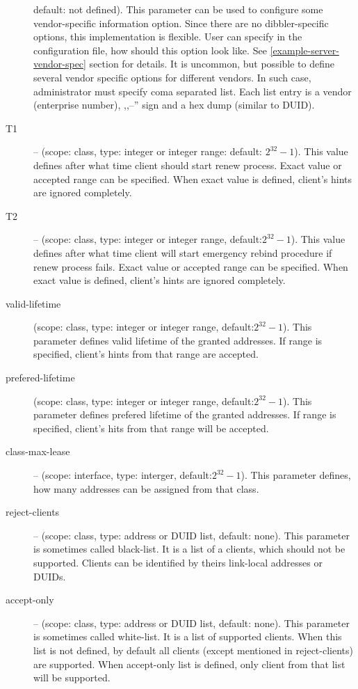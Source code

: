 \begin{description}
	    default: not defined). This parameter can be used to
	    configure some vendor-specific information option. Since
	    there are no dibbler-specific options, this implementation
	    is flexible. User can specify in the configuration file,
	    how should this option look like. See
	    \ref{example-server-vendor-spec} section for details. It
            is uncommon, but possible to define several vendor
            specific options for different vendors. In such case,
            administrator must specify coma separated list. Each list
            entry is a vendor (enterprise number), ,,--'' sign and a
            hex dump (similar to DUID).
 \item[T1] -- (scope: class, type: integer or integer range: default:
            $2^{32}-1$). This value
	    defines after what time client should start renew
	    process. Exact value or accepted range can be
            specified. When exact value is defined, client's hints are
            ignored completely. 
 \item[T2] -- (scope: class, type: integer or integer range, default:$2^{32}-1$). This value
	    defines after what time client will start emergency rebind
	    procedure if renew process fails. Exact value or accepted range can be
            specified. When exact value is defined, client's hints are
            ignored completely.
\item[valid-lifetime] (scope: class, type: integer or integer range,
	    default:$2^{32}-1$). This parameter defines valid lifetime of
	    the granted addresses. If range is specified, client's
            hints from that range are accepted.
\item[prefered-lifetime] (scope: class, type: integer or integer range,
	    default:$2^{32}-1$). This parameter defines prefered
            lifetime of the granted addresses. If range is specified,
            client's hits from that range will be accepted.
\item[class-max-lease]  -- (scope: interface, type: interger,
            default:$2^{32}-1$). This parameter defines, how many
            addresses can be assigned from that class.
\item[reject-clients] -- (scope: class, type: address or DUID list,
            default: none). This parameter is sometimes called
            black-list. It is a list of a clients, which should not be
            supported. Clients can be identified by theirs link-local
            addresses or DUIDs.
\item[accept-only] -- (scope: class, type: address or DUID list,
            default: none). This parameter is sometimes called
            white-list. It is a list of supported clients. When this
            list is not defined, by default all clients (except
            mentioned in reject-clients) are supported. When
            accept-only list is defined, only client from that list
            will be supported.
\end{description}

